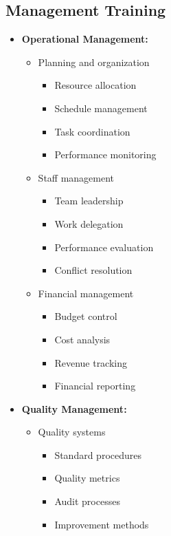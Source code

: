\subsection{Management Training}
\begin{itemize}
    \item \textbf{Operational Management:}
    \begin{itemize}
        \item Planning and organization
        \begin{itemize}
            \item Resource allocation
            \item Schedule management
            \item Task coordination
            \item Performance monitoring
        \end{itemize}
        
        \item Staff management
        \begin{itemize}
            \item Team leadership
            \item Work delegation
            \item Performance evaluation
            \item Conflict resolution
        \end{itemize}
        
        \item Financial management
        \begin{itemize}
            \item Budget control
            \item Cost analysis
            \item Revenue tracking
            \item Financial reporting
        \end{itemize}
    \end{itemize}
    
    \item \textbf{Quality Management:}
    \begin{itemize}
        \item Quality systems
        \begin{itemize}
            \item Standard procedures
            \item Quality metrics
            \item Audit processes
            \item Improvement methods
        \end{itemize}
        

\end{itemize}
\end{itemize}
